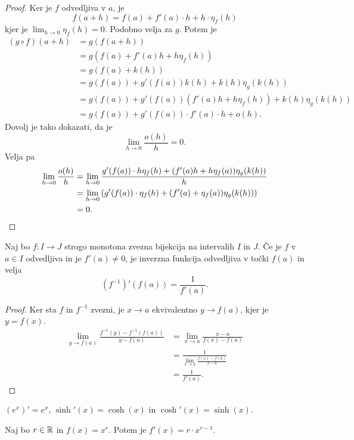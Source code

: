 \documentclass[12pt, a4paper]{article}
\begin{document}
\begin{proof}
Ker je $f$ odvedljiva v $a$, je
\[
f(a+h)=f(a)+f'(a)\cdot h+h\cdot\eta_f(h)
\]
kjer je $\displaystyle\lim_{h\to 0}\eta_f(h)=0$. Podobno velja za $g$. Potem je
\begin{align*}
(g\circ f)(a+h)&=g(f(a+h))
\\
&=g(f(a)+f'(a)h+h\eta_f(h))
\\
&=g(f(a)+k(h))
\\
&=g(f(a))+g'(f(a))k(h)+k(h)\eta_g(k(h))
\\
&=g(f(a))+g'(f(a))\left(f'(a)h+h\eta_f(h)\right)+k(h)\eta_g(k(h))
\\
&=g(f(a))+g'(f(a))\cdot f'(a)\cdot h+o(h).
\end{align*}
Dovolj je tako dokazati, da je
\[
\lim_{h\to 0}\frac{o(h)}{h}=0.
\]
Velja pa
\begin{align*}
\lim_{h\to 0}\frac{o(h)}{h}&=\lim_{h\to 0}\frac{g'(f(a))\cdot h\eta_f(h)+(f'(a)h+h\eta_f(a))\eta_g(k(h))}{h}
\\
&=\lim_{h\to 0}\left(g'(f(a))\cdot \eta_f(h)+(f'(a)+\eta_f(a))\eta_g(k(h))\right)
\\
&=0.\qedhere
\end{align*}
\end{proof}

\begin{izrek}
Naj bo $f\colon I\to J$ strogo monotona zvezna bijekcija na intervalih $I$ in $J$. Če je $f$ v $a\in I$ odvedljiva in je $f'(a)\ne 0$, je inverzna funkcija odvedljiva v točki $f(a)$ in velja
\[
\left(f^{-1}\right)'(f(a))=\frac{1}{f'(a)}.
\]
\end{izrek}

\begin{proof}
Ker sta $f$ in $f^{-1}$ zvezni, je $x\to a$ ekvivalentno $y\to f(a)$, kjer je $y=f(x)$.
\begin{align*}
\lim_{y\to f(a)}\frac{f^{-1}(y)-f^{-1}(f(a))}{y-f(a)}&=\lim_{x\to a}\frac{x-a}{f(x)-f(a)}
\\
&=\frac{1}{\displaystyle\lim_{x\to a}\frac{f(x)-f(a)}{x-a}}
\\
&=\frac{1}{f'(a)}.
\end{align*}
\end{proof}

\begin{posledica}
$(e^x)'=e^x$, $\sinh'(x)=\cosh(x)$ in $\cosh'(x)=\sinh(x)$.
\end{posledica}

\obvs

\begin{posledica}
Naj bo $r\in\mathbb{R}$ in $f(x)=x^r$. Potem je $f'(x)=r\cdot x^{r-1}$.
\end{posledica}
\end{document}
